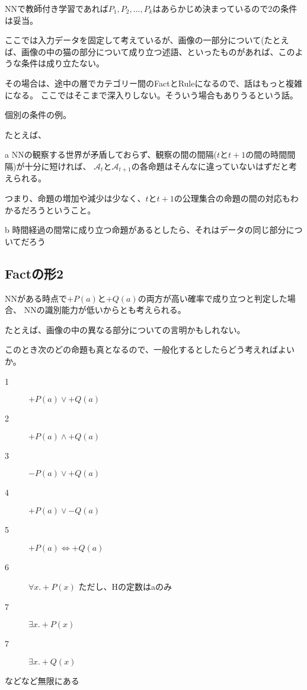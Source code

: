 \documentclass[10pt, oneside]{jarticle}   	%
\begin{document}
NNで教師付き学習であれば$P_1,P_2, \dots, P_k$はあらかじめ決まっているので2の条件は妥当。

ここでは入力データを固定して考えているが、画像の一部分について(たとえば、画像の中の猫の部分について成り立つ述語、といったものがあれば、このような条件は成り立たない。

その場合は、途中の層でカテゴリー間のFactとRuleになるので、話はもっと複雑になる。
ここではそこまで深入りしない。そういう場合もありうるという話。

個別の条件の例。

たとえば、
\item[ a] NNの観察する世界が矛盾しておらず、観察の間の間隔($t$と$t+1$の間の時間間隔)が十分に短ければ、
$\mathcal{A}_t$と$\mathcal{A}_{t+1}$の各命題はそんなに違っていないはずだと考えられる。

つまり、命題の増加や減少は少なく、$t$と$t+1$の公理集合の命題の間の対応もわかるだろうということ。

\item[ b] 時間経過の間常に成り立つ命題があるとしたら、それはデータの同じ部分についてだろう


\subsection{Factの形2}
NNがある時点で$+P(a)$と$+Q(a)$の両方が高い確率で成り立つと判定した場合、
NNの識別能力が低いからとも考えられる。

たとえば、画像の中の異なる部分についての言明かもしれない。

このとき次のどの命題も真となるので、一般化するとしたらどう考えればよいか。

\begin{description}
\item[ 1] $+P(a) \lor +Q(a)$
\item[2] $+P(a) \land +Q(a)$
\item[3] $-P(a) \lor +Q(a)$
\item[4] $+P(a) \lor -Q(a)$
\item[5] $+P(a) \iff +Q(a)$
\item[6] $\forall x. +P(x)$ ただし、Hの定数はaのみ
\item[7] $\exists x.+P(x)$
\item[7] $\exists x.+Q(x)$
\end{description}
などなど無限にある
\end{document}
